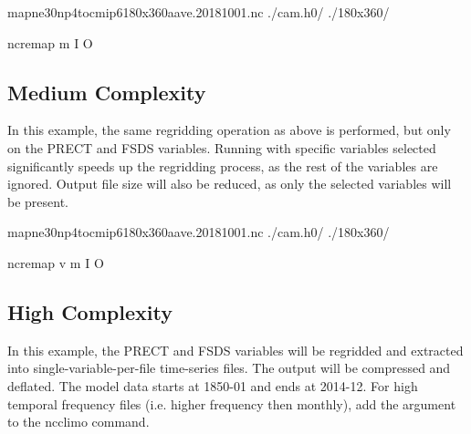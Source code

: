 \documentclass[letterpaper,10pt,english]{sphinxmanual}
\begin{document}
\begin{sphinxVerbatim}[commandchars=\\\{\}]
map\PYGZus{}ne30np4\PYGZus{}to\PYGZus{}cmip6\PYGZus{}180x360\PYGZus{}aave.20181001.nc
./cam.h0/
./180x360/

ncremap \PYGZhy{}m  \PYGZhy{}I  \PYGZhy{}O 
\end{sphinxVerbatim}


\subsection{Medium Complexity}
\label{\detokenize{atm_regrid:medium-complexity}}
In this example, the same regridding operation as above is performed, but only on the PRECT and FSDS variables.
Running with specific variables selected significantly speeds up the regridding process, as the rest of the variables are ignored.
Output file size will also be reduced, as only the selected variables will be present.

\begin{sphinxVerbatim}[commandchars=\\\{\}]
map\PYGZus{}ne30np4\PYGZus{}to\PYGZus{}cmip6\PYGZus{}180x360\PYGZus{}aave.20181001.nc
./cam.h0/
./180x360/

ncremap \PYGZhy{}v  \PYGZhy{}m  \PYGZhy{}I  \PYGZhy{}O 
\end{sphinxVerbatim}


\subsection{High Complexity}
\label{\detokenize{atm_regrid:high-complexity}}
In this example, the PRECT and FSDS variables will be regridded and extracted into single-variable-per-file time-series files.
The output will be compressed and deflated. The model data starts at 1850-01 and ends at 2014-12. For high temporal frequency files
(i.e. higher frequency then monthly), add the  argument to the ncclimo command.
\end{document}
